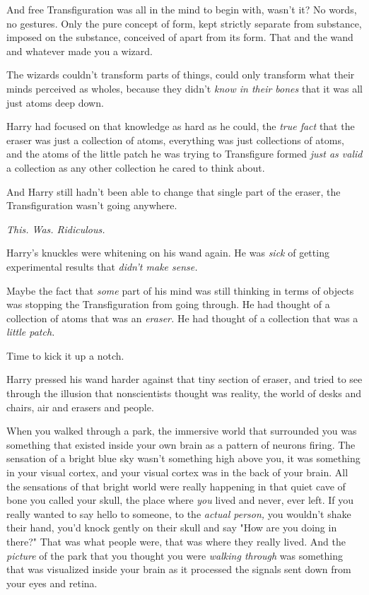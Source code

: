 And free Transfiguration was all in the mind to begin with, wasn't it? No 
words, no gestures. Only the pure concept of form, kept strictly separate from 
substance, imposed on the substance, conceived of apart from its form. That and 
the wand and whatever made you a wizard.

The wizards couldn't transform parts of things, could only transform what their 
minds perceived as wholes, because they didn't \emph{know in their bones} that 
it was all just atoms deep down.

Harry had focused on that knowledge as hard as he could, the \emph{true fact} 
that the eraser was just a collection of atoms, everything was just collections 
of atoms, and the atoms of the little patch he was trying to Transfigure formed 
\emph{just as valid} a collection as any other collection he cared to think 
about.

And Harry still hadn't been able to change that single part of the eraser, the 
Transfiguration wasn't going anywhere.

\emph{This. Was. Ridiculous.}

Harry's knuckles were whitening on his wand again. He was \emph{sick} of 
getting experimental results that \emph{didn't make sense.}

Maybe the fact that \emph{some} part of his mind was still thinking in terms of 
objects was stopping the Transfiguration from going through. He had thought of 
a collection of atoms that was an \emph{eraser.} He had thought of a collection 
that was a \emph{little patch.}

Time to kick it up a notch.

Harry pressed his wand harder against that tiny section of eraser, and tried to 
see through the illusion that nonscientists thought was reality, the world of 
desks and chairs, air and erasers and people.

When you walked through a park, the immersive world that surrounded you was 
something that existed inside your own brain as a pattern of neurons firing. 
The sensation of a bright blue sky wasn't something high above you, it was 
something in your visual cortex, and your visual cortex was in the back of your 
brain. All the sensations of that bright world were really happening in that 
quiet cave of bone you called your skull, the place where \emph{you} lived and 
never, ever left. If you really wanted to say hello to someone, to the 
\emph{actual person,} you wouldn't shake their hand, you'd knock gently on 
their skull and say "How are you doing in there?" That was what people were, 
that was where they really lived. And the \emph{picture} of the park that you 
thought you were \emph{walking through} was something that was visualized 
inside your brain as it processed the signals sent down from your eyes and 
retina.

